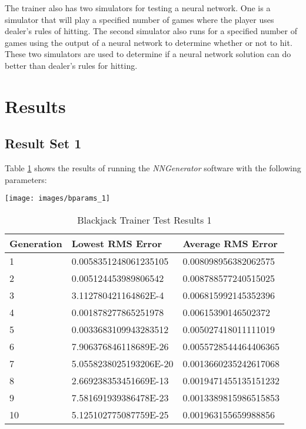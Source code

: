 The trainer also has two simulators for testing a neural network.
One is a simulator that will play a specified number of games where
the player uses dealer's rules of hitting.
The second simulator also runs for a specified number of games using
the output of a neural network to determine whether or not to hit.
These two simulators are used to determine if a neural network
solution can do better than dealer's rules for hitting.

\section{Results}
\subsection{Result Set 1}

Table \ref{btr1} shows the results of running the {\it NNGenerator} software with the following parameters:

\begin{center}
\texttt{[image: images/bparams\_1]}
\end{center}

\begin{center}
    \begin{longtable}{ | l | l | l |}
      \caption{Blackjack Trainer Test Results 1} \label{btr1} \\
   \hline
  Generation & Lowest RMS Error & Average RMS Error \\ \hline
1 &	0.0058351248061235105 &	0.008098956382062575 \\ \hline
2 &	0.005124453989806542 &	0.008788577240515025 \\ \hline
3 &	3.112780421164862E-4 &	0.006815992145352396 \\ \hline
4 &	0.001878277865251978 &	0.00615390146502372 \\ \hline
5 &	0.0033683109943283512 &	0.005027418011111019 \\ \hline
6 &	7.906376846118689E-26 &	0.0055728544464406365 \\ \hline
7 &	5.0558238025193206E-20 &	0.0013660235242617068 \\ \hline
8 &	2.669238353451669E-13 &	0.0019471455135151232 \\ \hline
9 &	7.581691939386478E-23 &	0.0013389815986515853 \\ \hline
10 &	5.125102775087759E-25 &	0.001963155659988856 \\ \hline
\end{longtable}
\end{center}

